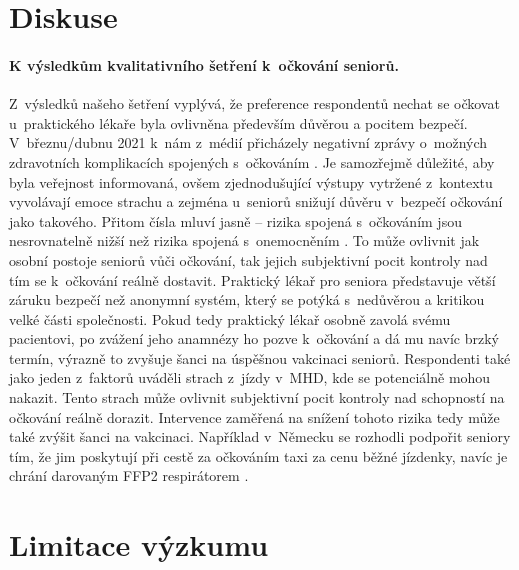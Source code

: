 \vspace{-0.7eM}

\section*{Diskuse}

\vspace{-0.4eM}

\paragraph*{K výsledkům kvalitativního šetření k~očkování seniorů.}
Z~výsledků našeho šetření vyplývá, že preference respondentů nechat se očkovat u~praktického lékaře byla ovlivněna především důvěrou a pocitem bezpečí. V~březnu/dubnu 2021 k~nám z~médií přicházely negativní zprávy o~možných zdravotních komplikacích spojených s~očkováním \cite{Svamberk2021,MinisterstvoZdravotnictviCR2021a}. Je samozřejmě důležité, aby byla ve\-řej\-nost informovaná, ovšem zjednodušující výstupy vytržené z~kontextu vyvolávají emoce strachu a zejména u~seniorů snižují důvěru v~bezpečí očkování jako takového. Přitom čísla mluví jasně – rizika spojená s~očkováním jsou nesrovnatelně nižší než rizika spojená s~onemocněním \cite{Statniustavprokontroluleciv2021}. 
To může ovlivnit jak osobní postoje seniorů vůči očkování, tak jejich subjektivní pocit kontroly nad tím se k~očkování reálně dostavit. Praktický lékař pro seniora představuje větší záruku bezpečí než anonymní systém, který se potýká s~nedůvěrou a kritikou velké části společnosti. Pokud tedy praktický lékař osobně zavolá svému pacientovi, po zvážení jeho anamnézy ho pozve k~očkování a dá mu navíc brzký termín, výrazně to zvyšuje šanci na úspěšnou vakcinaci seniorů.
Respondenti také jako jeden z~faktorů uváděli strach z~jízdy v~MHD, kde se potenciálně mohou nakazit. Tento strach může ovlivnit subjektivní pocit kontroly nad schopností na očkování reálně dorazit. Intervence zaměřená na snížení tohoto rizika tedy může také zvýšit šanci na vakcinaci. Například v~Německu se rozhodli podpořit seniory tím, že jim poskytují při cestě za očkováním taxi za cenu běžné jízdenky, navíc je chrání darovaným FFP2 respirátorem \cite{Kreijger2021}.

\section*{Limitace výzkumu}

